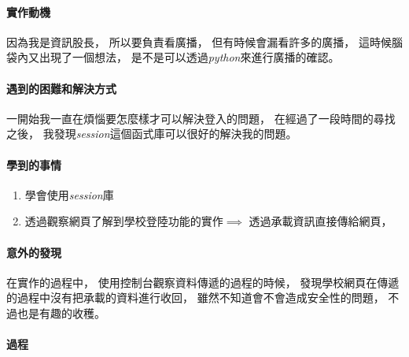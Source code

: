 \documentclass[12pt]{ctexart}
\begin{document}
\paragraph{ 實作動機 }
\begin{adjustwidth}{2em}{0em}
   因為我是資訊股長，
   所以要負責看廣播，
   但有時候會漏看許多的廣播，
   這時候腦袋內又出現了一個想法，
   是不是可以透過\textit{python}來進行廣播的確認。
\end{adjustwidth}

\paragraph{ 遇到的困難和解決方式 }
\begin{adjustwidth}{2em}{0em}
    一開始我一直在煩惱要怎麼樣才可以解決登入的問題，
    在經過了一段時間的尋找之後，
    我發現\textit{session}這個函式庫可以很好的解決我的問題。
\end{adjustwidth}

\paragraph{ 學到的事情 }
\begin{adjustwidth}{2em}{0em}
\begin{enumerate}
    \item 
        學會使用\textit{session}庫
    \item 
        透過觀察網頁了解到學校登陸功能的實作$\implies$
        透過承載資訊直接傳給網頁，
\end{enumerate}  
\end{adjustwidth}

\paragraph{ 意外的發現 }
\begin{adjustwidth}{2em}{0em}
    在實作的過程中，
    使用控制台觀察資料傳遞的過程的時候，
    發現學校網頁在傳遞的過程中沒有把承載的資料進行收回，
    雖然不知道會不會造成安全性的問題，
    不過也是有趣的收穫。
\end{adjustwidth}

\clearpage
\paragraph{ 過程 }
\hspace*{\fill}\\
\begin{figure}[H]
\centering
{}
\end{figure}
\end{document}
